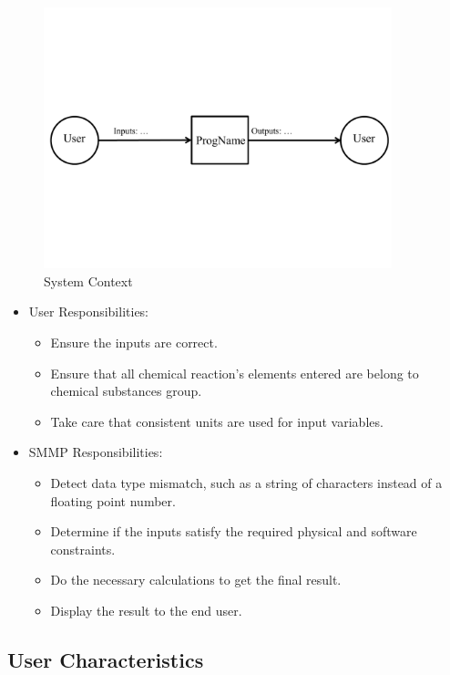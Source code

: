 \documentclass[12pt]{article}
\begin{document}
\begin{figure}[h!]
\begin{center}
 \includegraphics[width=0.9\textwidth]{SystemContextFigure}
\caption{System Context}
\label{Fig_SystemContext} 
\end{center}
\end{figure}


\begin{itemize}
\item User Responsibilities:
\begin{itemize}
\item Ensure the inputs are correct.
\item Ensure that all chemical reaction's elements entered are belong to chemical substances group.
\item Take care that consistent units are used for input variables.
\end{itemize}
\item SMMP Responsibilities:
\begin{itemize}
\item Detect data type mismatch, such as a string of characters instead of a
  floating point number.
\item Determine if the inputs satisfy the required physical and software constraints.
\item Do the necessary calculations to get the final result.
\item Display the result to the end user.
\end{itemize}
\end{itemize}

\subsection{User Characteristics} \label{SecUserCharacteristics}
\end{document}
